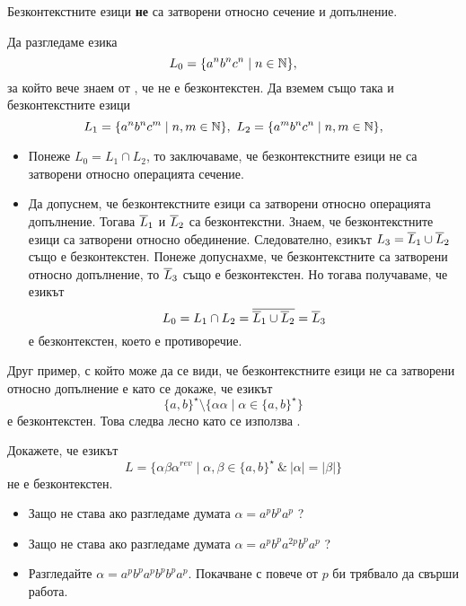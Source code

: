\begin{framed}
  \begin{proposition}
    Безконтекстните езици {\bf не} са затворени относно сечение и допълнение.
  \end{proposition}
\end{framed}
\begin{hint}
  Да разгледаме езика
  \[L_0 = \{a^nb^nc^n\mid n\in\mathbb{N}\},\] за който вече знаем от , че не е безконтекстен.
  Да вземем също така и безконтекстните езици 
  \[L_1 = \{a^nb^nc^m\mid n,m\in\mathbb{N}\},\ L_2 = \{a^mb^nc^n\mid n,m\in\mathbb{N}\},\]
  \begin{itemize}
  \item 
    Понеже $L_0 = L_1\cap L_2$, то заключаваме, че безконтекстните езици не са затворени 
    относно операцията сечение.
  \item
    Да допуснем, че безконтекстните езици са затворени относно операцията допълнение.
    Тогава  $\overline{L}_1$ и $\overline{L}_2$ са безконтекстни.
    Знаем, че безконтекстните езици са затворени относно обединение. 
    Следователно, езикът $L_3 = \overline{L}_1 \cup \overline{L}_2$ също е безконтекстен.
    Понеже допуснахме, че безконтекстните са затворени относно допълнение, то $\overline{L}_3$ също е безконтекстен.
    Но тогава получаваме, че езикът
    \[L_0 = L_1 \cap L_2 = \overline{\overline{L}_1 \cup \overline{L}_2} = \overline{L}_3\]
    е безконтекстен, което е противоречие.
  \end{itemize}

  Друг пример, с който може да се види, че безконтекстните езици не са затворени относно допълнение е 
  като се докаже, че езикът
  \[\{a,b\}^\star \setminus \{\alpha\alpha\mid \alpha\in \{a,b\}^\star\}\]
  е безконтекстен.
  Това следва лесно като се използва .
\end{hint}

\begin{problem}
  Докажете, че езикът 
  \[L = \{\alpha\beta\alpha^{rev} \mid \alpha,\beta \in \{a,b\}^\star\ \&\ |\alpha| = |\beta|\}\]
  не е безконтекстен.
\end{problem}
\begin{hint}
  \begin{itemize}
  \item
    Защо не става ако разгледаме думата $\alpha = a^pb^pa^p$ ?
  \item 
    Защо не става ако разгледаме думата $\alpha = a^p b^p a^{2p} b^p a^p$ ?
  \item
    Разгледайте $\alpha = a^p b^p a^p b^p b^p a^p$.
    Покачване с повече от $p$ би трябвало да свърши работа.
  \end{itemize}
\end{hint}


